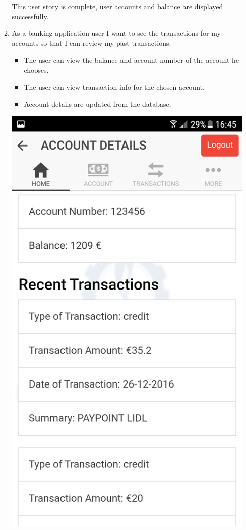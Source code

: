 \begin{itemize}
\begin{enumerate}
\begin{center}
\end{center}
            This user story is complete, user accounts and balance are displayed successfully.
        \item As a banking application user I want to see the transactions for my accounts so that I can review my past transactions.
            \begin{itemize}
                \item The user can view the balance and account number of the account he chooses.
                \item The user can view transaction info for the chosen account.
                \item Account details are updated from the database.
            \end{itemize}
\begin{center}
    \includegraphics[scale=0.5]{img/8homepagetransactions.png}

\end{center}
\end{enumerate}
\end{itemize}
